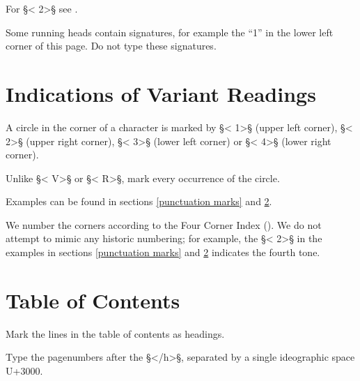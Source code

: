 \documentclass[fontsize=11pt, paper=a4, 
DIV15,
headings=normal,
parskip=half-, 
numbers=noenddot]{scrartcl}
\newcommand{\chin}[1]{{\fontspec{Sun-ExtA}{#1}}}
\newcommand{\z}[1]{\chin{#1}} %
\begin{document}
\begin{crossref}
For §< 2>§ see .
\end{crossref}

\begin{note}
Some running heads contain signatures, for example the “1” in the lower left corner of this page. Do not type these signatures.
\end{note}


\section{Indications of Variant Readings}
\label{readings}

\begin{mainrule}
A circle in the corner of a character is marked by §< 1>§ (upper left corner), §< 2>§ (upper right corner), §< 3>§ (lower left corner) or §< 4>§ (lower right corner).
\end{mainrule}

\begin{clarification}
Unlike §< V>§ or §< R>§, mark every occurrence of the circle.
\end{clarification}

\begin{crossref}
Examples can be found in sections \ref{punctuation marks} and \ref{toc}.
\end{crossref}

\vspace{3mm}
\begin{note}
We number the corners according to the Four Corner Index (\z{四角號碼}). We do not attempt to mimic any historic numbering; for example, the §< 2>§ in the examples in sections \ref{punctuation marks} and \ref{toc} indicates the fourth tone.
\end{note}


\section{Table of Contents}
\label{toc}

\begin{mainrule}
Mark the lines in the table of contents as headings.
\end{mainrule}

\begin{clarification}
Type the pagenumbers after the §</h>§, separated by a single ideographic space U+3000.
\end{clarification}
\end{document}
